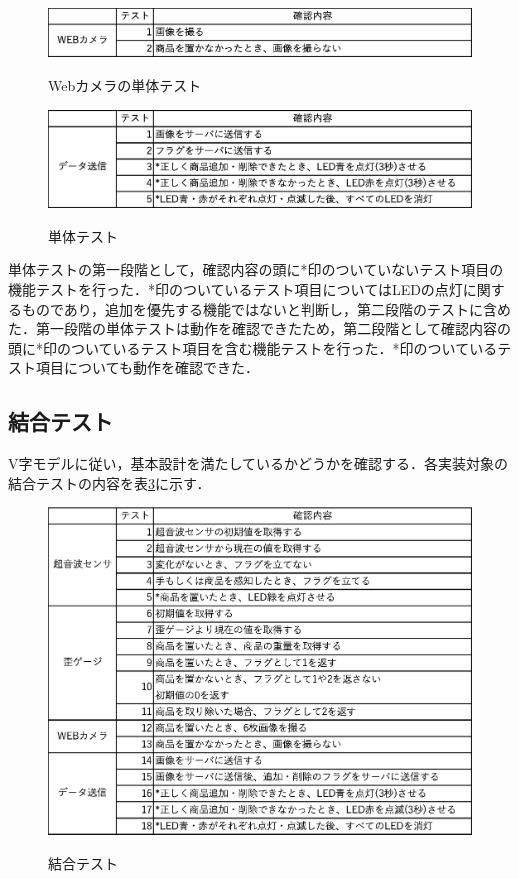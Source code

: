 \begin{figure}[htbp]
\centering
\caption{Webカメラの単体テスト}
\includegraphics[width = 15cm]{./picture/webcamera.eps}
\label{webcamera}
\end{figure}

\begin{figure}[htbp]
\centering
\caption{単体テスト}
\includegraphics[width = 15cm]{./picture/data.eps}
\label{data}
\end{figure}

単体テストの第一段階として，確認内容の頭に*印のついていないテスト項目の機能テストを行った．*印のついているテスト項目についてはLEDの点灯に関するものであり，追加を優先する機能ではないと判断し，第二段階のテストに含めた．第一段階の単体テストは動作を確認できたため，第二段階として確認内容の頭に*印のついているテスト項目を含む機能テストを行った．*印のついているテスト項目についても動作を確認できた．


\subsection{結合テスト}

V字モデルに従い，基本設計を満たしているかどうかを確認する．各実装対象の結合テストの内容を表\ref{ketsugo}に示す．


\begin{figure}[htbp]
\centering
\caption{結合テスト}
\includegraphics[width = 15cm]{./picture/ketsugo.eps}
\label{ketsugo}
\end{figure}

